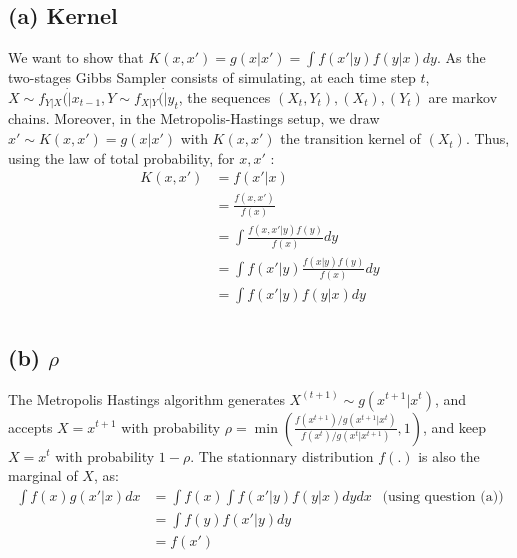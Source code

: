 \documentclass{article}
\begin{document}
\subsection*{(a) Kernel}
We want to show that $K(x, x') = g(x|x') = \int f(x'|y) f(y|x) dy$.
As the two-stages Gibbs Sampler consists of simulating, at each time step $t$, 
$X \sim f_{Y|X}(\dot|x_{t-1}, Y \sim f_{X|Y}(\dot|y_{t}$, the sequences
$(X_t, Y_t), (X_t), (Y_t)$ are markov chains.
Moreover, in the Metropolis-Hastings setup, we draw $x' \sim K(x, x') = g(x|x')$
with $K(x, x')$ the transition kernel of $(X_t)$. Thus, using the law of total probability,
for $x, x'$ : 
\begin{align*}
    K(x, x') &= f(x'|x) \\
            &= \frac{f(x, x')}{f(x)} \\
            &= \int \frac{f(x, x'|y)f(y)}{f(x)} dy\\
            &= \int f(x'|y)\frac{f(x|y)f(y)}{f(x)} dy \\
            &= \int f(x'|y) f(y|x) dy \\
\end{align*}
\subsection*{(b) $\rho$}

The Metropolis Hastings algorithm generates $X^{(t+1)} \sim g(x^{t+1}|x^t)$, and accepts 
$X=x^{t+1}$ with probability $\rho = \min(\frac{f(x^{t+1})/g(x^{t+1}|x^t)}
{f(x^{t})/g(x^{t}|x^{t+1})}, 1)$, and keep $X = x^t$ with probability $1-\rho$. 
The stationnary distribution $f(.) $ is also the marginal of $X$, as: 
\begin{align*}
    \int f(x)g(x'|x) dx &= \int f(x)\int  f(x'|y) f(y|x) dy  dx \ \ \text{ (using question (a))}\\
    &= \int f(y) f(x'|y) dy \\
    &= f(x')
\end{align*}
\end{document}
